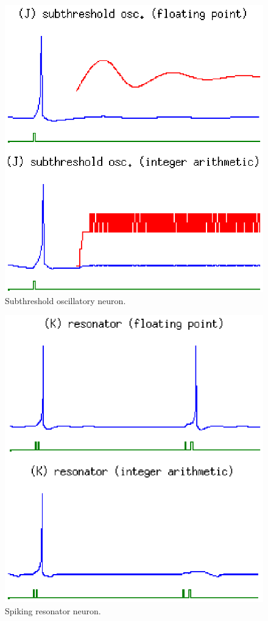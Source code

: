 \documentclass[journal]{./sty/IEEEtran}
\begin{document}
\begin{figure}
\centering
\includegraphics[scale=0.6]{imgs/izh_subthreshold_osc}
\caption{Subthreshold oscillatory neuron.}
\end{figure}

\begin{figure}
\centering
\includegraphics[scale=0.6]{imgs/izh_resonator}
\caption{Spiking resonator neuron.}
\end{figure}
\end{document}
